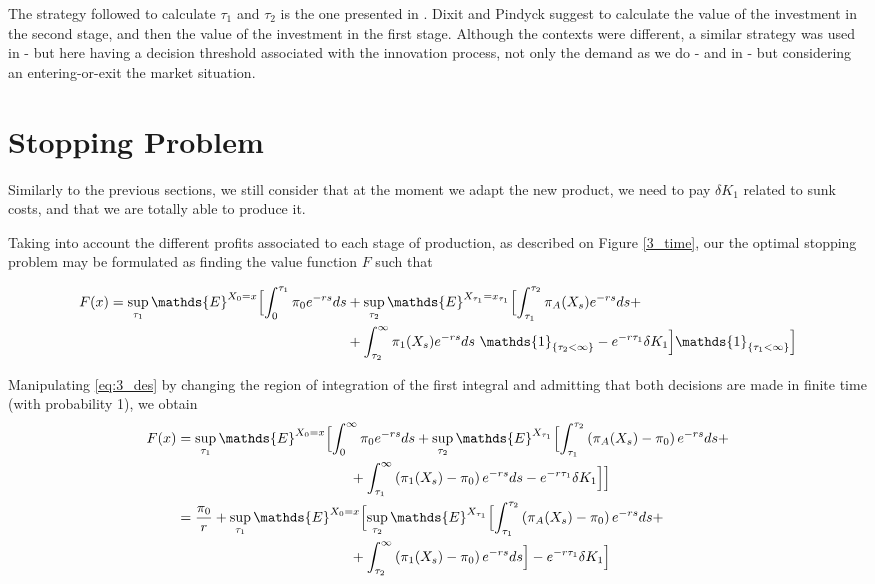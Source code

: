 The strategy followed to calculate $\tau_1$ and $\tau_2$ is the one presented in \cite{dixit:book}. Dixit and Pindyck suggest to
calculate the value of the investment in the second stage, and then the value of the investment in the first stage. Although the contexts were different, a similar strategy was used in \cite{rita} - but here having a decision threshold associated with the innovation process, not only the demand as we do - and in \cite{hagspiel:cap} - but considering an entering-or-exit the market situation.

\section{Stopping Problem}
\label{section:2_theory}



Similarly to the previous sections, we still consider that at the moment we adapt the new product, we need to pay $\delta K_1$ related to sunk costs, and that we are totally able to produce it. 

Taking into account the different profits associated to each stage of production, as described on Figure \ref{3_time}, our the optimal stopping problem may be formulated as finding the value function $F$ such that

\begin{align}
F(x)=\sup _{\tau_1} \mathds{E}^{X_0=x} \Bigl[ \int_0^{\tau_1} \pi_0e^{-rs} ds &+ \sup_{\tau_2} \mathds{E}^{X_{\tau_1}=x_{\tau_1}} \Bigl[ \int_{\tau_1}^{\tau_2}  \pi_A(X_s) e^{-rs}ds + \nonumber \\
& +\int_{\tau_2}^\infty \pi_1(X_s)e^{-rs}ds \ \mathds{1}_{ \{\tau_2<\infty \} } -e^{-r \tau_1}\delta K_1  \Bigr] \mathds{1}_{ \{\tau_1<\infty \} } \Bigr]
\label{eq:3_des}
\end{align}


Manipulating \eqref{eq:3_des} by changing the region of integration of the first integral and admitting that both decisions are made in finite time (with probability 1), we obtain
\begin{align}
F(x)&=\sup _{\tau_1} \mathds{E}^{X_0=x} \Bigl[ \int_0^{\infty} \pi_0e^{-rs} ds +\sup_{\tau_2} \mathds{E}^{X_{\tau_1}} \Bigl[ \int_{\tau_1}^{\tau_2} \left( \pi_A(X_s)-\pi_0 \right) e^{-rs}ds +  \nonumber \\
&\hspace{4.35cm} +\int_{\tau_1}^\infty \left( \pi_1(X_s)-\pi_0 \right) e^{-rs}ds -e^{-r \tau_1}\delta K_1  \Bigr] \Bigr] \nonumber  \\
&=\frac{\pi_0}{r}+\sup _{\tau_1} \mathds{E}^{X_0=x} \Bigl[  \sup_{\tau_2} \mathds{E}^{X_{\tau_1}} \Bigl[ \int_{\tau_1}^{\tau_2} \left( \pi_A(X_s)-\pi_0 \right) e^{-rs}ds +\\
&\hspace{4.35cm}+ \int_{\tau_2}^\infty \left( \pi_1(X_s)-\pi_0 \right) e^{-rs}ds  \Bigr] -e^{-r \tau_1}\delta K_1 \Bigr]  \nonumber
\label{eq:32} 
\end{align}

